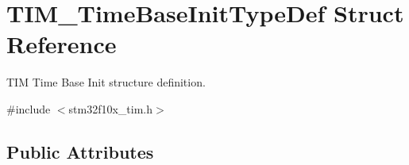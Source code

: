 \hypertarget{struct_t_i_m___time_base_init_type_def}{}\section{T\+I\+M\+\_\+\+Time\+Base\+Init\+Type\+Def Struct Reference}
\label{struct_t_i_m___time_base_init_type_def}


T\+IM Time Base Init structure definition.  




{\ttfamily \#include $<$stm32f10x\+\_\+tim.\+h$>$}

\subsection*{Public Attributes}
